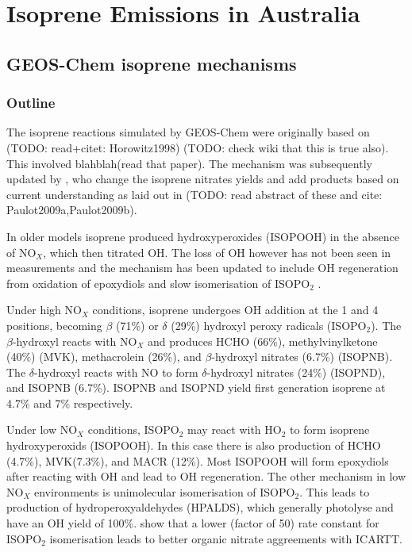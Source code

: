 
\chapter{Isoprene Emissions in Australia} %
\label{ch_isop} %

\section{GEOS-Chem isoprene mechanisms}
\label{ch_isop:sec:GEOSChemMechanisms}
  \subsection{Outline}
    The isoprene reactions simulated by GEOS-Chem were originally based on (TODO: read+citet: Horowitz1998) (TODO: check wiki that this is true also).
    This involved blahblah(read that paper).
    The mechanism was subsequently updated by \citet{Mao2013}, who change the isoprene nitrates yields and add products based on current understanding as laid out in (TODO: read abstract of these and cite: Paulot2009a,Paulot2009b).

    In older models isoprene produced hydroxyperoxides (ISOPOOH) in the absence of NO$_X$, which then titrated OH.
    The loss of OH however has not been seen in measurements and the mechanism has been updated to include OH regeneration from oxidation of epoxydiols and slow isomerisation of ISOPO$_2$ \citep{Mao2013}.
    
    Under high NO$_X$ conditions, isoprene undergoes OH addition at the 1 and 4 positions, becoming $\beta$ (71\%) or $\delta$ (29\%) hydroxyl peroxy radicals (ISOPO$_2$). 
    The $\beta$-hydroxyl reacts with NO$_X$ and produces HCHO (66\%), methylvinylketone (40\%) (MVK), methacrolein (26\%), and $\beta$-hydroxyl nitrates (6.7\%) (ISOPNB).
    The $\delta$-hydroxyl reacts with NO to form $\delta$-hydroxyl nitrates (24\%) (ISOPND), and ISOPNB (6.7\%).
    ISOPNB and ISOPND yield first generation isoprene at 4.7\% and 7\% respectively.
    
    Under low NO$_X$ conditions, ISOPO$_2$ may react with HO$_2$ to form isoprene hydroxyperoxids (ISOPOOH).
    In this case there is also production of HCHO (4.7\%), MVK(7.3\%), and MACR (12\%).
    Most ISOPOOH will form epoxydiols after reacting with OH and lead to OH regeneration.
    The other mechanism in low NO$_X$ environments is unimolecular isomerisation of ISOPO$_2$.
    This leads to production of hydroperoxyaldehydes (HPALDS), which generally photolyse and have an OH yield of 100\%.
    \citet{Mao2013} show that a lower (factor of 50) rate constant for ISOPO$_2$ isomerisation leads to better organic nitrate aggreements with ICARTT. 
    
